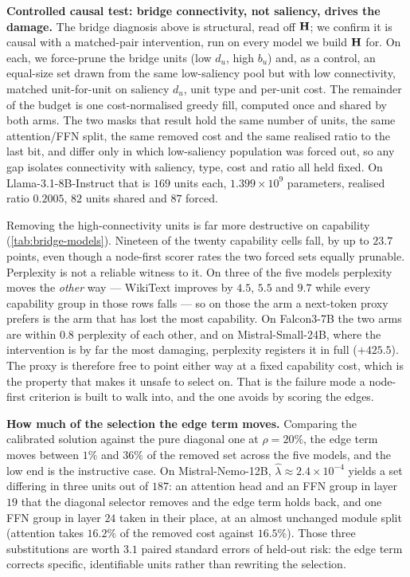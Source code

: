 \textbf{Controlled causal test: bridge connectivity, not saliency, drives the damage.}
The bridge diagnosis above is structural, read off $\mathbf{H}$; we confirm it is causal with a
matched-pair intervention, run on every model we build $\mathbf{H}$ for. On each, we force-prune the bridge
units (low $d_u$, high $b_u$) and, as a control, an equal-size set drawn from the same low-saliency
pool but with low connectivity, matched unit-for-unit on saliency $d_u$, unit type and per-unit cost.
The remainder of the budget is one cost-normalised greedy fill, computed once and shared by both arms.
The two masks that result hold the same number of units, the same attention/FFN split, the same
removed cost and the same realised ratio to the last bit, and differ only in which low-saliency
population was forced out, so any gap isolates connectivity with saliency, type, cost and ratio all
held fixed. On Llama-3.1-8B-Instruct that is $169$ units each, $1.399\times10^{9}$ parameters,
realised ratio $0.2005$, $82$ units shared and $87$ forced.

Removing the high-connectivity units is far more destructive on capability
(\cref{tab:bridge-models}). Nineteen of the twenty capability cells fall, by up to $23.7$ points, even
though a node-first scorer rates the two forced sets equally prunable. Perplexity is not a reliable
witness to it. On three of the five models perplexity moves the \emph{other} way --- WikiText improves
by $4.5$, $5.5$ and $9.7$ while every capability group in those rows falls --- so on those the arm a
next-token proxy prefers is the arm that has lost the most capability. On Falcon3-7B the two arms are
within $0.8$ perplexity of each other, and on Mistral-Small-24B, where the intervention is by far the
most damaging, perplexity registers it in full ($+425.5$). The proxy is therefore free to point either
way at a fixed capability cost, which is the property that makes it unsafe to select on. That is the failure mode a node-first criterion
is built to walk into, and the one \method avoids by scoring the edges.

\textbf{How much of the selection the edge term moves.} Comparing the calibrated solution against
the pure diagonal one at $\rho{=}20\%$, the edge term moves between $1\%$ and $36\%$ of the removed
set across the five models, and the low end is the instructive case. On Mistral-Nemo-12B,
$\hat\lambda\!\approx\!2.4\times10^{-4}$ yields a set differing in three units out of $187$: an
attention head and an FFN group in layer $19$ that the diagonal selector removes and the edge term
holds back, and one FFN group in layer $24$ taken in their place, at an almost unchanged module split
(attention takes $16.2\%$ of the removed cost against $16.5\%$). Those three substitutions are worth
$3.1$ paired standard errors of held-out risk: the edge term corrects specific, identifiable units
rather than rewriting the selection.

